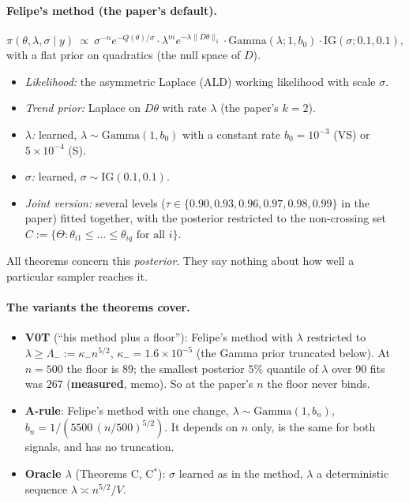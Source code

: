 \documentclass[11pt]{article}
\newcommand{\norm}[1]{\lVert #1\rVert}
\newcommand{\IG}{\mathrm{IG}}
\newcommand{\Ga}{\mathrm{Gamma}}
\newcommand{\ME}{\textbf{measured}}
\theoremstyle{plain}
\begin{document}
\paragraph{Felipe's method (the paper's default).}
\[
\pi(\theta,\lambda,\sigma\mid y)\ \propto\ \sigma^{-n}e^{-Q(\theta)/\sigma}\cdot\lambda^{m}e^{-\lambda\norm{D\theta}_1}\cdot\Ga(\lambda;1,b_0)\cdot\IG(\sigma;0.1,0.1),
\]
with a flat prior on quadratics (the null space of $D$).
\begin{itemize}
\item \emph{Likelihood:} the asymmetric Laplace (ALD) working likelihood with scale $\sigma$.
\item \emph{Trend prior:} Laplace on $D\theta$ with rate $\lambda$ (the paper's $k=2$).
\item \emph{$\lambda$:} learned, $\lambda\sim\Ga(1,b_0)$ with a constant rate $b_0=10^{-3}$ (VS) or $5\times10^{-4}$ (S).
\item \emph{$\sigma$:} learned, $\sigma\sim\IG(0.1,0.1)$.
\item \emph{Joint version:} several levels ($\tau\in\{0.90,0.93,0.96,0.97,0.98,0.99\}$ in the paper) fitted together, with the posterior restricted to the non-crossing set $C:=\{\Theta:\theta_{i1}\le\dots\le\theta_{iq}\text{ for all }i\}$.
\end{itemize}
All theorems concern this \emph{posterior}. They say nothing about how well a particular sampler reaches it.

\paragraph{The variants the theorems cover.}
\begin{itemize}
\item \textbf{V0T} (``his method plus a floor''): Felipe's method with $\lambda$ restricted to $\lambda\ge\Lambda_-:=\kappa_-n^{5/2}$, $\kappa_-=1.6\times10^{-5}$ (the Gamma prior truncated below). At $n=500$ the floor is $89$; the smallest posterior $5\%$ quantile of $\lambda$ over 90 fits was $267$ (\ME, memo). So at the paper's $n$ the floor never binds.
\item \textbf{A-rule}: Felipe's method with one change, $\lambda\sim\Ga(1,b_n)$, $b_n=1/(5500\,(n/500)^{5/2})$. It depends on $n$ only, is the same for both signals, and has no truncation.
\item \textbf{Oracle $\lambda$} (Theorems C, C$^*$): $\sigma$ learned as in the method, $\lambda$ a deterministic sequence $\lambda\asymp n^{5/2}/V$.
\end{itemize}
\end{document}
